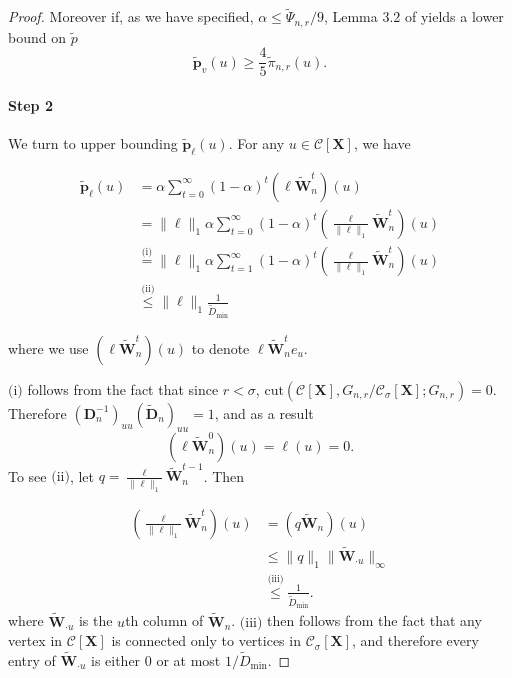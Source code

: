 \documentclass{article}
\newcommand{\1}{\mathbf{1}}
\newcommand{\cut}{\mathrm{cut}}
\newcommand{\pbf}{\mathbf{p}}
\newcommand{\Xbf}{\mathbf{X}}
\newcommand{\Wbf}{\mathbf{W}}
\newcommand{\Dbf}{\mathbf{D}}
\newcommand{\Cset}{\mathcal{C}}
\newcommand{\Csig}{\Cset_{\sigma}}
\theoremstyle{aldenthm}
\begin{document}
\begin{proof}
	Moreover if, as we have specified, $\alpha \leq \widetilde{\Psi}_{n,r}/9$, Lemma 3.2 of \cite{zhu2013} yields a lower bound on $\widetilde{p}$
	\begin{equation} \label{eqn: page_rank_mixes}
	\widetilde{\pbf}_v(u) \geq \frac{4}{5} \widetilde{\pi}_{n,r}(u).
	\end{equation}
	
	\paragraph{Step 2}
	
	We turn to upper bounding $\widetilde{\pbf}_{\ell}(u)$. For any $u \in \Cset[\Xbf]$, we have
	
	\begin{align} \label{eqn: leakage_page_rank_body}
	\widetilde{\pbf}_{\ell}(u) & = \alpha \sum_{t = 0}^{\infty} (1 - \alpha)^t \left(\ell \widetilde{\Wbf}_n^t \right)(u)  \nonumber \\
	& = \|\ell\|_1 \alpha \sum_{t = 0}^{\infty} (1 - \alpha)^t \left(\frac{\ell}{\|\ell\|_1}  \widetilde{\Wbf}_n^t \right)(u)\nonumber \\
	& \overset{\text{(i)}}{=} \|\ell\|_1 \alpha \sum_{t = 1}^{\infty} (1 - \alpha)^t \left(\frac{\ell}{\|\ell\|_1}  \widetilde{\Wbf}_n^t \right)(u)\nonumber \\
	& \overset{\text{(ii)}}{\leq} \|\ell\|_1 \frac{1}{\widetilde{D}_{\min}} 
	\end{align}
	
	where we use $\left(\ell \widetilde{\Wbf}_n^t \right)(u)$ to denote $\ell \widetilde{\Wbf}_n^te_u$.
	
	$\text{(i)}$ follows from the fact that since $r < \sigma$, $\cut(\Cset[\Xbf], G_{n,r} / \Csig[\Xbf]; G_{n,r}) = 0$. Therefore $(\Dbf_n^{-1})_{uu} (\widetilde{\Dbf}_n)_{uu} = 1$, and as a result
	\begin{equation*}
	(\ell \widetilde{\Wbf}_n^0)(u) = \ell(u) = 0.
	\end{equation*}
	To see $\text{(ii)}$, let $q = \frac{\ell}{\|\ell\|_1}  \widetilde{\Wbf}_n^{t-1}$. Then 
	
	\begin{align*}
	\left(\frac{\ell}{\|\ell\|_1}  \widetilde{\Wbf}_n^t \right)(u) & = \left(q \widetilde{\Wbf}_n \right)(u) \\
	& \leq \|q\|_1 \|\widetilde{\Wbf}_{\cdot u}\|_{\infty} \\
	& \overset{\text{(iii)}}{\leq} \frac{1}{\widetilde{D}_{\min}}.
	\end{align*}
	where $\widetilde{\Wbf}_{\cdot u}$ is the $u$th column of $\widetilde{\Wbf}_n$. $\text{(iii)}$ then follows from the fact that any vertex in $\Cset[\Xbf]$ is connected only to vertices in $\Csig[\Xbf]$, and therefore every entry of $\widetilde{\Wbf}_{\cdot u}$ is either $0$ or at most $1 / \widetilde{D}_{\min}$.
	

\end{proof}
\end{document}
